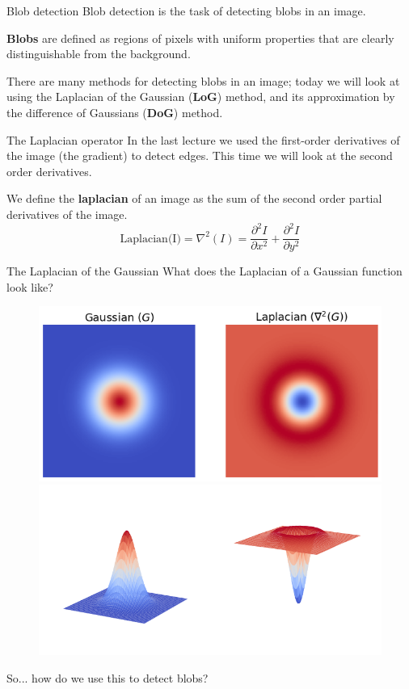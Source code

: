 \documentclass[9pt, aspectratio=169]{beamer}
\begin{document}
\begin{frame}
    {Blob detection}
    Blob detection is the task of detecting blobs in an image.

    \textbf{Blobs} are defined as regions of pixels with uniform properties that are clearly distinguishable from the background.

    There are many methods for detecting blobs in an image; today we will look at using the Laplacian of the Gaussian (\textbf{LoG}) method, and its approximation by the difference of Gaussians (\textbf{DoG}) method.
\end{frame}

\begin{frame}
    {The Laplacian operator}
    In the last lecture we used the first-order derivatives of the image (the gradient) to detect edges. This time we will look at the second order derivatives.

    \pause
    We define the \textbf{laplacian} of an image as the sum of the second order partial derivatives of the image.
    \large{
    $$\text{Laplacian(I)} = \nabla^2(I) = \frac{\partial^2{I}}{\partial{x^2}} + \frac{\partial^2{I}}{\partial{y^2}}$$
    }
\end{frame}

\begin{frame}
    {The Laplacian of the Gaussian}
    What does the Laplacian of a Gaussian function look like?

    \begin{figure}
        \centering
        \includegraphics[width=.45\textwidth]{gaussian_and_laplacian_2D.png}
        \includegraphics[width=.45\textwidth]{gaussian_and_laplacian_3D.png}
    \end{figure}

    So... how do we use this to detect blobs?
\end{frame}
\end{document}
